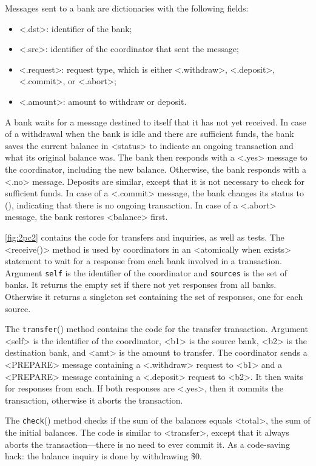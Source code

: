 \documentclass{report}
\begin{document}
\noindent
Messages sent to a bank are dictionaries with the following fields:
\begin{itemize}
\item <{.dst}>: identifier of the bank;
\item <{.src}>: identifier of the coordinator that sent the message;
\item <{.request}>: request type, which is either
<{.withdraw}>, <{.deposit}>, <{.commit}>, or <{.abort}>;
\item <{.amount}>: amount to withdraw or deposit.
\end{itemize}

\noindent
A bank waits for a message destined to itself that it has not yet received.
In case of a withdrawal when the bank is idle and there are sufficient
funds, the bank saves the current balance in <{status}> to indicate
an ongoing transaction and what its original balance was.
The bank then responds with a <{.yes}> message to the coordinator,
including the new balance.
Otherwise, the bank responds with a <{.no}> message.
Deposits are similar, except that it is not necessary to check for
sufficient funds.
In case of a <{.commit}> message, the bank changes its status
to (), indicating that there is no ongoing transaction.  In case of
a <{.abort}> message, the bank restores <{balance}> first.

\autoref{fig:2pc2} contains the code for transfers and inquiries, as well
as tests.
The <{receive()}> method is used by coordinators in an
<{atomically when exists}>
statement to wait for a response from each bank involved in a transaction.
Argument \texttt{self} is the
identifier of the coordinator and \texttt{sources} is the set of banks.
It returns the empty set if there not yet responses from all banks.
Otherwise it returns a singleton set containing the set of responses,
one for each source.

The \texttt{transfer}() method contains the code for the transfer
transaction.  Argument <{self}> is the identifier of the coordinator,
<{b1}> is the source bank, <{b2}> is the destination bank,
and <{amt}> is the amount to transfer.
The coordinator sends a <{PREPARE}> message containing a
<{.withdraw}> request to <{b1}> and a <{PREPARE}>
message containing a <{.deposit}> request to <{b2}>.
It then waits for responses from each.  If both responses are
<{.yes}>, then it commits the transaction, otherwise it aborts
the transaction.

The \texttt{check}() method checks if the sum of the balances equals
<{total}>, the sum of the initial balances.
The code is similar to <{transfer}>, except that it always
aborts the transaction---there is no need to ever commit it.
As a code-saving hack: the balance inquiry is done by withdrawing \$0.
\end{document}
